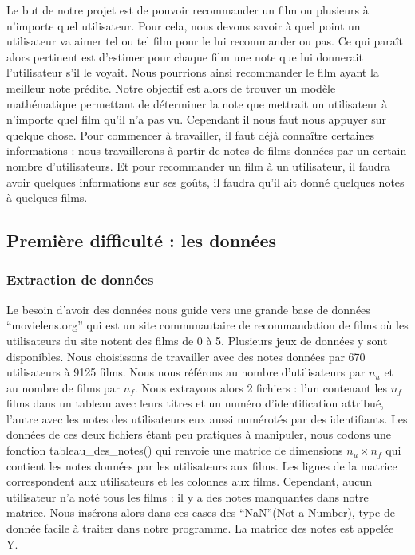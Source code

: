 \documentclass[a4paper,10pt]{article}
\begin{document}
Le but de notre projet est de pouvoir recommander un film ou plusieurs à n'importe quel utilisateur. 
Pour cela, nous devons savoir à quel point un utilisateur va aimer tel ou tel film pour le lui recommander ou pas. Ce qui paraît alors pertinent est d'estimer pour chaque film une note que lui donnerait l'utilisateur s'il le voyait. 
Nous pourrions ainsi recommander le film ayant la meilleur note prédite.
Notre objectif est alors de trouver un modèle mathématique permettant de déterminer la note que mettrait un utilisateur à n'importe quel film qu'il n'a pas vu. Cependant il nous faut nous appuyer sur quelque chose. Pour commencer à travailler, il faut déjà connaître certaines informations : nous travaillerons à partir de notes de films données par un certain nombre d'utilisateurs. Et pour recommander un film à un utilisateur, il faudra avoir quelques informations sur ses goûts, il faudra qu'il ait donné quelques notes à quelques films.

\subsection{Première difficulté : les données}
\subsubsection{Extraction de données}

Le besoin d'avoir des données nous guide vers une grande base de données ``movielens.org'' qui est un site communautaire de recommandation de films où les utilisateurs du site notent des films de 0 à 5.
Plusieurs jeux de données y sont disponibles. 
Nous choisissons de travailler avec des notes données par 670 utilisateurs à 9125 films.
Nous nous référons au nombre d'utilisateurs par $n_u$ et au nombre de films par $n_f$.
Nous extrayons alors 2 fichiers : l’un contenant les $n_f$ films dans un tableau avec leurs titres et un numéro d'identification attribué, l’autre avec les notes des utilisateurs eux aussi numérotés par des identifiants. 
Les données de ces deux fichiers étant peu pratiques à manipuler,  
nous codons une fonction tableau\_des\_notes() qui renvoie une matrice de dimensions $n_u \times n_f$ qui contient les notes données par les utilisateurs aux films.
Les lignes de la matrice correspondent aux utilisateurs et les colonnes aux films. Cependant, aucun utilisateur n'a noté tous les films : il y a des notes manquantes dans notre matrice.
Nous insérons alors dans ces cases des ``NaN''(Not a Number), type de donnée facile à traiter dans notre programme.
La matrice des notes est appelée Y.
\end{document}
